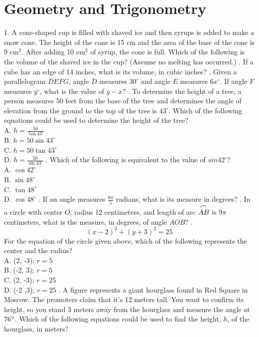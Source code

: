 \documentclass[../satmath.tex]{subfiles}
\begin{document}
\chapter{Geometry and Trigonometry}
1. A cone-shaped cup is filled with shaved ice and then syrups is added to make a snow cone. The height of the cone is 15 cm and the area of the base of the cone is 
9 cm$^2$. After adding 10 cm$^3$ of syrup, the cone is full. Which of the following is the volume of the shaved ice in the cup? (Assume no melting has occurred.)
. If a cube has an edge of 14 inches, what is its volume, in cubic inches?
. Given a parallelogram $DEFG$, angle $D$ measures $30^{\circ}$ and angle $E$ measures $6x^{\circ}$. If angle $F$ measures $y^{\circ}$, what is the value of $y-x$?
. To determine the height of a tree, a person measures 50 feet from the base of the tree and determines the angle of elevation from the ground to the top of the tree is $43^{\circ}$. Which of the following equations could be used to determine the height of the tree?\\
A. $h=\frac{50}{\tan 43^{\circ}}$\\
B. $h=50\sin 43^{\circ}$\\
C. $h=50 \tan 43^{\circ}$\\
D. $h=\frac{50}{\sin 43^{\circ}}$
. Which of the following is equivalent to the value of $sin 42^{\circ}$?\\
A. $\cos 42^{\circ}$\\
B. $\sin 48^{\circ}$\\
C. $\tan 48^{\circ}$\\
D. $\cos 48^{\circ}$
. If an angle measures $\frac{8\pi}{5}$ radians, what is its measure in degrees?
. In a circle with center $O$, radius 12 centimeters, and length of arc $\stackrel{\mbox{\large$\frown$}}{AB}$ is $9\pi$ centimeters, what is the measure, in degrees, of angle $AOB$?
. 
\[(x-2)^2+(y+3)^2=25\]
For the equation of the circle given above, which of the following represents the center and the radius?\\
A. (2, -3); $r=5$\\
B. (-2, 3); $r=5$\\
C. (2, -3); $r=25$\\
D. (-2 ,3); $r=25$
. A figure represents a giant hourglass found in Red Square in Moscow. The promoters claim that it's 12 meters tall. You want to confirm its height, so you stand 
3 meters away from the hourglass and measure the angle at 76$\degree$. Which of the following equations could be used to find the height, $h$, of the hourglass, in meters?\\
\end{document}
